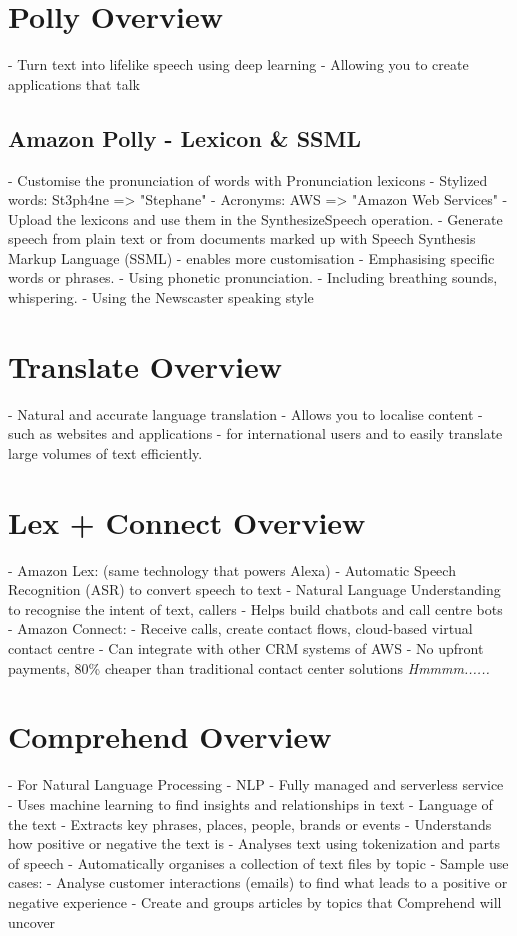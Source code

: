 \documentclass[11pt]{book}
\begin{document}
    \section{Polly Overview}
    - Turn text into lifelike speech using deep learning
    - Allowing you to create applications that talk

    \subsection{Amazon Polly - Lexicon \& SSML}
    - Customise the pronunciation of words with Pronunciation lexicons
        - Stylized words: St3ph4ne => "Stephane"
        - Acronyms: AWS => "Amazon Web Services"
    - Upload the lexicons and use them in the SynthesizeSpeech operation.
    - Generate speech from plain text or from documents marked up with Speech Synthesis Markup Language (SSML) - enables more customisation
        - Emphasising specific words or phrases.
        - Using phonetic pronunciation.
        - Including breathing sounds, whispering.
        - Using the Newscaster speaking style

    \section{Translate Overview}
    - Natural and accurate language translation
    - Allows you to localise content - such as websites and applications - for international users and to easily translate large volumes of text efficiently.

    \section{Lex + Connect Overview}
    - Amazon Lex: (same technology that powers Alexa)
        - Automatic Speech Recognition (ASR) to convert speech to text
        - Natural Language Understanding to recognise the intent of text, callers
        - Helps build chatbots and call centre bots
    - Amazon Connect:
        - Receive calls, create contact flows, cloud-based virtual contact centre
        - Can integrate with other CRM systems of AWS
        - No upfront payments, 80\% cheaper than traditional contact center solutions \textit{Hmmmm......}
    \section{Comprehend Overview}
    - For Natural Language Processing - NLP
    - Fully managed and serverless service
    - Uses machine learning to find insights and relationships in text
        - Language of the text
        - Extracts key phrases, places, people, brands or events
        - Understands how positive or negative the text is
        - Analyses text using tokenization and parts of speech
        - Automatically organises a collection of text files by topic
    - Sample use cases:
        - Analyse customer interactions (emails) to find what leads to a positive or negative experience
        - Create and groups articles by topics that Comprehend will uncover
\end{document}
